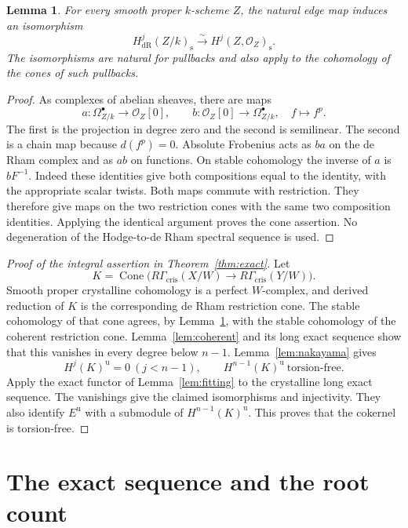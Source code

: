 \documentclass[11pt]{article}
\newtheorem{lemma}[theorem]{Lemma}
\theoremstyle{remark}\newtheorem{remark}[theorem]{Remark}
\newcommand{\OO}{\mathcal O}
\newcommand{\cris}{\mathrm{cris}}
\newcommand{\dR}{\mathrm{dR}}
\newcommand{\st}{\mathrm{s}}
\newcommand{\uF}{\mathrm{u}}
\newcommand{\Cone}{\operatorname{Cone}}
\begin{document}
\begin{lemma}\label{lem:edge}
For every smooth proper $k$-scheme $Z$, the natural edge map induces an isomorphism
\[
 H^j_{\dR}(Z/k)_{\st}\xrightarrow{\sim}H^j(Z,\OO_Z)_{\st}.
\]
The isomorphisms are natural for pullbacks and also apply to the cohomology of the cones of such pullbacks.
\end{lemma}
\begin{proof}
As complexes of abelian sheaves, there are maps
\[
 a:\Omega^\bullet_{Z/k}\longrightarrow\OO_Z[0],
 \qquad b:\OO_Z[0]\longrightarrow\Omega^\bullet_{Z/k},
 \quad f\longmapsto f^p.
\]
The first is the projection in degree zero and the second is semilinear. The second is a chain map because $d(f^p)=0$. Absolute Frobenius acts as $ba$ on the de Rham complex and as $ab$ on functions. On stable cohomology the inverse of $a$ is $bF^{-1}$. Indeed these identities give both compositions equal to the identity, with the appropriate scalar twists. Both maps commute with restriction. They therefore give maps on the two restriction cones with the same two composition identities. Applying the identical argument proves the cone assertion. No degeneration of the Hodge-to-de Rham spectral sequence is used.
\end{proof}

\begin{proof}[Proof of the integral assertion in Theorem~\ref{thm:exact}]
Let
\[
 K=\Cone\bigl(R\Gamma_{\cris}(X/W)
          \longrightarrow R\Gamma_{\cris}(Y/W)\bigr).
\]
Smooth proper crystalline cohomology is a perfect $W$-complex, and derived reduction of $K$ is the corresponding de Rham restriction cone. The stable cohomology of that cone agrees, by Lemma~\ref{lem:edge}, with the stable cohomology of the coherent restriction cone. Lemma~\ref{lem:coherent} and its long exact sequence show that this vanishes in every degree below $n-1$. Lemma~\ref{lem:nakayama} gives
\[
 H^j(K)^{\uF}=0\ (j<n-1),\qquad
 H^{n-1}(K)^{\uF}\ \text{torsion-free}.
\]
Apply the exact functor of Lemma~\ref{lem:fitting} to the crystalline long exact sequence. The vanishings give the claimed isomorphisms and injectivity. They also identify $E^{\uF}$ with a submodule of $H^{n-1}(K)^{\uF}$. This proves that the cokernel is torsion-free.
\end{proof}

\section{The exact sequence and the root count}
\end{document}

